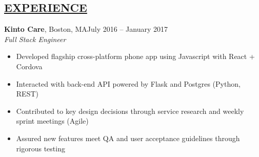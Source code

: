 \documentclass[overlapped,line]{res}
\begin{document}
\begin{resume}
\section{\underline{EXPERIENCE}}

\textbf{Kinto Care}, Boston, MA\hfill July 2016 \--- January 2017\\
{\sl Full Stack Engineer}
\begin{itemize} \itemsep -2pt
\item Developed flagship cross-platform phone app using Javascript with React + Cordova
\item Interacted with back-end API powered by Flask and Postgres (Python, REST)
\item Contributed to key design decisions through service research and weekly sprint meetings (Agile)
\item Assured new features meet QA and user acceptance guidelines through rigorous testing 
\end{itemize}



\end{resume}
\end{document}
